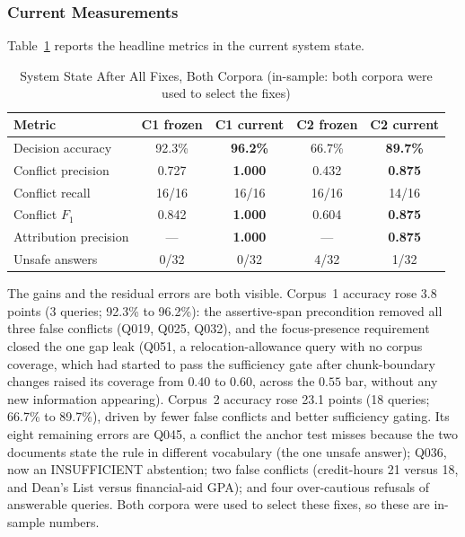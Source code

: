 \documentclass[conference]{IEEEtran}
\begin{document}
\subsubsection{Current Measurements}

Table~\ref{tab:fixes_headline} reports the headline metrics in the
current system state.

\begin{table}[t] %
\caption{System State After All Fixes, Both Corpora (in-sample: both corpora were used to select the fixes)}
\label{tab:fixes_headline}
\centering
\small
\begin{tabular}{l c c c c}
\toprule
Metric & C1 frozen & C1 current & C2 frozen & C2 current \\
\midrule
Decision accuracy    & 92.3\% & \textbf{96.2\%} & 66.7\% & \textbf{89.7\%} \\
Conflict precision   & 0.727  & \textbf{1.000}  & 0.432  & \textbf{0.875}  \\
Conflict recall      & 16/16  & 16/16           & 16/16  & 14/16           \\
Conflict $F_1$       & 0.842  & \textbf{1.000}  & 0.604  & \textbf{0.875}  \\
Attribution precision& ---    & \textbf{1.000}  & ---    & \textbf{0.875}  \\
Unsafe answers       & 0/32   & 0/32            & 4/32   & 1/32            \\
\bottomrule
\end{tabular}
\end{table} %



The gains and the residual errors are both visible. Corpus~1 accuracy rose
3.8 points (3 queries; 92.3\% to 96.2\%): the assertive-span precondition removed all
three false conflicts (Q019, Q025, Q032), and the focus-presence requirement
closed the one gap leak (Q051, a relocation-allowance query with no corpus
coverage, which had started to pass the sufficiency gate after chunk-boundary
changes raised its coverage from $0.40$ to $0.60$, across the $0.55$ bar,
without any new information appearing). Corpus~2 accuracy rose 23.1 points
(18 queries; 66.7\% to 89.7\%), driven by fewer false conflicts and better sufficiency
gating. Its eight remaining errors are Q045, a conflict the anchor test
misses because the two documents state the rule in different vocabulary (the
one unsafe answer); Q036, now an INSUFFICIENT abstention; two false conflicts
(credit-hours 21 versus 18, and Dean's List versus financial-aid GPA); and
four over-cautious refusals of answerable queries. Both corpora were used to
select these fixes, so these are in-sample numbers.
\end{document}
